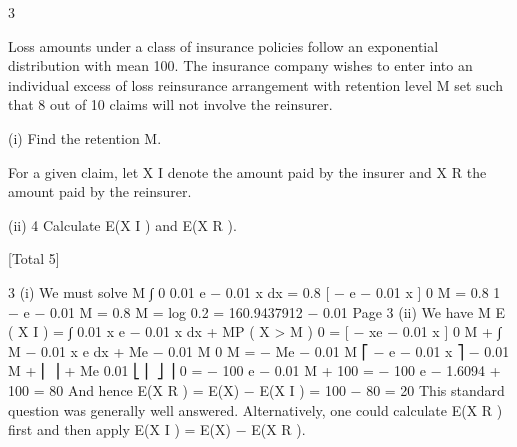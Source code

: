 
3

Loss amounts under a class of insurance policies follow an exponential distribution
with mean 100. The insurance company wishes to enter into an individual excess of
loss reinsurance arrangement with retention level M set such that 8 out of 10 claims
will not involve the reinsurer.
\item (i)
Find the retention M.

For a given claim, let X I denote the amount paid by the insurer and X R the amount
paid by the reinsurer.
\item (ii)
4
Calculate E(X I ) and E(X R ).

[Total 5]



3
(i)
We must solve
M
∫ 0
0.01 e − 0.01 x dx = 0.8
[ − e − 0.01 x ] 0 M = 0.8
1 − e − 0.01 M = 0.8
M =
log 0.2
= 160.9437912
− 0.01
Page 3%
(ii)
We have
M
E ( X I ) = ∫ 0.01 x e − 0.01 x dx + MP ( X > M )
0
= [ − xe − 0.01 x ] 0 M + ∫
M − 0.01 x
e
dx + Me − 0.01 M
0
M
= − Me
− 0.01 M
⎡ − e − 0.01 x ⎤
− 0.01 M
+ ⎢
⎥ + Me
0.01
⎣ ⎢
⎦ ⎥ 0
= − 100 e − 0.01 M + 100
= − 100 e − 1.6094 + 100 = 80
And hence E(X R ) = E(X) − E(X I ) = 100 − 80 = 20
This standard question was generally well answered. Alternatively, one could calculate
E(X R ) first and then apply E(X I ) = E(X) − E(X R ).


